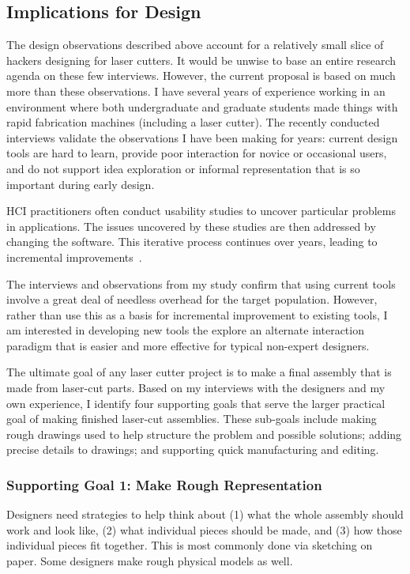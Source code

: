 \documentclass[11pt]{article}
\begin{document}
\subsection{Implications for Design}

The design observations described above account for a relatively small
slice of hackers designing for laser cutters. It would be unwise to
base an entire research agenda on these few interviews. However, the
current proposal is based on much more than these observations. I have
several years of experience working in an environment where both
undergraduate and graduate students made things with rapid fabrication
machines (including a laser cutter). The recently conducted interviews
validate the observations I have been making for years: current design
tools are hard to learn, provide poor interaction for novice or
occasional users, and do not support idea exploration or informal
representation that is so important during early design.

HCI practitioners often conduct usability studies to uncover
particular problems in applications. The issues uncovered by these
studies are then addressed by changing the software. This iterative
process continues over years, leading to incremental
improvements~\cite{buxton-sketching}.

The interviews and observations from my study confirm that using
current tools involve a great deal of needless overhead for the target
population. However, rather than use this as a basis for incremental
improvement to existing tools, I am interested in developing new tools
the explore an alternate interaction paradigm that is easier and more
effective for typical non-expert designers.

The ultimate goal of any laser cutter project is to make a final
assembly that is made from laser-cut parts. Based on my interviews
with the designers and my own experience, I identify four supporting
goals that serve the larger practical goal of making finished
laser-cut assemblies. These sub-goals include making rough drawings
used to help structure the problem and possible solutions; adding
precise details to drawings; and supporting quick manufacturing and
editing.

\subsubsection{Supporting Goal 1: Make Rough Representation} 

Designers need strategies to help think about (1) what the whole
assembly should work and look like, (2) what individual pieces should
be made, and (3) how those individual pieces fit together. This is
most commonly done via sketching on paper. Some designers make
rough physical models as well.
\end{document}
